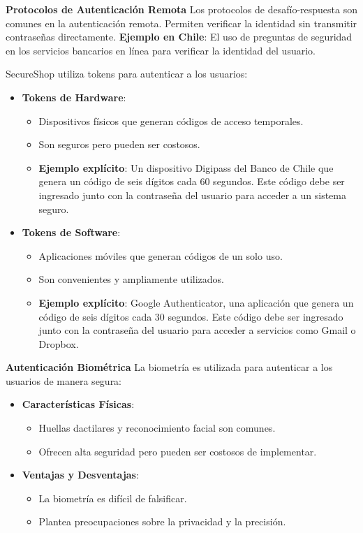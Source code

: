 \textbf{Protocolos de Autenticación Remota}
Los protocolos de desafío-respuesta son comunes en la autenticación remota. Permiten verificar la identidad sin transmitir contraseñas directamente. 
\textbf{Ejemplo en Chile}: El uso de preguntas de seguridad en los servicios bancarios en línea para verificar la identidad del usuario.

SecureShop utiliza tokens para autenticar a los usuarios:

\begin{itemize}
    \item \textbf{Tokens de Hardware}:
    \begin{itemize}
        \item Dispositivos físicos que generan códigos de acceso temporales.
        \item Son seguros pero pueden ser costosos.
        \item \textbf{Ejemplo explícito}: Un dispositivo Digipass del Banco de Chile que genera un código de seis dígitos cada 60 segundos. Este código debe ser ingresado junto con la contraseña del usuario para acceder a un sistema seguro.
    \end{itemize}
    \item \textbf{Tokens de Software}:
    \begin{itemize}
        \item Aplicaciones móviles que generan códigos de un solo uso.
        \item Son convenientes y ampliamente utilizados.
        \item \textbf{Ejemplo explícito}: Google Authenticator, una aplicación que genera un código de seis dígitos cada 30 segundos. Este código debe ser ingresado junto con la contraseña del usuario para acceder a servicios como Gmail o Dropbox.
    \end{itemize}
\end{itemize}




\textbf{Autenticación Biométrica}
La biometría es utilizada para autenticar a los usuarios de manera segura:

\begin{itemize}
    \item \textbf{Características Físicas}:
    \begin{itemize}
        \item Huellas dactilares y reconocimiento facial son comunes.
        \item Ofrecen alta seguridad pero pueden ser costosos de implementar.
    \end{itemize}
    \item \textbf{Ventajas y Desventajas}:
    \begin{itemize}
        \item La biometría es difícil de falsificar.
        \item Plantea preocupaciones sobre la privacidad y la precisión.
    \end{itemize}
\end{itemize}


